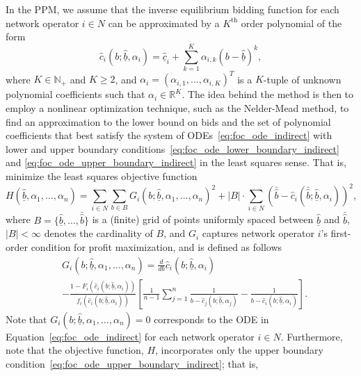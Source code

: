 In the PPM, we assume that the inverse equilibrium bidding function for each network operator $i\in N$ can be approximated by a $K^{\textrm{th}}$ order polynomial of the form
\begin{equation}
  \label{eq:polynomial_cost_function_indirect}
  \hat{c}_i(b;\underline{\hat{b}}, \alpha_i) = \underline{\hat{c}}_i + \sum_{k=1}^K \alpha_{i,k}(b - \underline{\hat{b}})^k,
\end{equation}
where $K\in\mathbb{N}_+$ and $K\geq 2$, and $\alpha_i = (\alpha_{i,1},\dotsc,\alpha_{i,K})^T$ is a $K$-tuple of unknown polynomial coefficients such that $\alpha_i\in\mathbb{R}^{K}$. The idea behind the method is then to employ a nonlinear optimization technique, such as the Nelder-Mead method, to find an approximation to the lower bound on bids and the set of polynomial coefficients that best satisfy the system of ODEs~\eqref{eq:foc_ode_indirect} with lower and upper boundary conditions~\eqref{eq:foc_ode_lower_boundary_indirect} and \eqref{eq:foc_ode_upper_boundary_indirect} in the least squares sense. That is, minimize the least squares objective function
\begin{equation}
  \label{eq:least_squares_objective_function_indirect}
  H(\underline{\hat{b}}, \alpha_1,\dotsc,\alpha_n) = \sum_{i\in N}\sum_{b\in B}G_i(b; \underline{\hat{b}}, \alpha_1,\dotsc, \alpha_n)^2 + |B|\cdot\sum_{i\in N} (\bar{\hat{b}} - \hat{c}_i(\bar{\hat{b}}; \underline{\hat{b}}, \alpha_i))^2,
\end{equation}
where $B=\{\underline{\hat{b}},\dotsc,\bar{\hat{b}}\}$ is a (finite) grid of points uniformly spaced between $\underline{\hat{b}}$ and $\bar{\hat{b}}$, $|B| < \infty$ denotes the cardinality of $B$, and $G_i$ captures network operator $i$'s first-order condition for profit maximization, and is defined as follows
\begin{align*}
  &G_i(b; \underline{\hat{b}}, \alpha_1, \dotsc, \alpha_n) = \displaystyle\frac{d}{db}\hat{c}_i(b;\underline{\hat{b}}, \alpha_i)\\
  &- \displaystyle\frac{1 - F_i(\hat{c}_i(b;\underline{\hat{b}}, \alpha_i))}{f_i(\hat{c}_i(b;\underline{\hat{b}}, \alpha_i))}\left[ \frac{1}{n-1}\sum_{j=1}^n\frac{1}{b - \hat{c}_j(b;\underline{\hat{b}}, \alpha_j)} - \frac{1}{b - \hat{c}_i(b;\underline{\hat{b}}, \alpha_i)} \right].
\end{align*}
Note that $G_i(b; \underline{\hat{b}}, \alpha_1,\dotsc, \alpha_n) = 0$ corresponds to the ODE in Equation~\eqref{eq:foc_ode_indirect} for each network operator $i\in N$. Furthermore, note that the objective function, $H$, incorporates only the upper boundary condition~\eqref{eq:foc_ode_upper_boundary_indirect}; that is,
